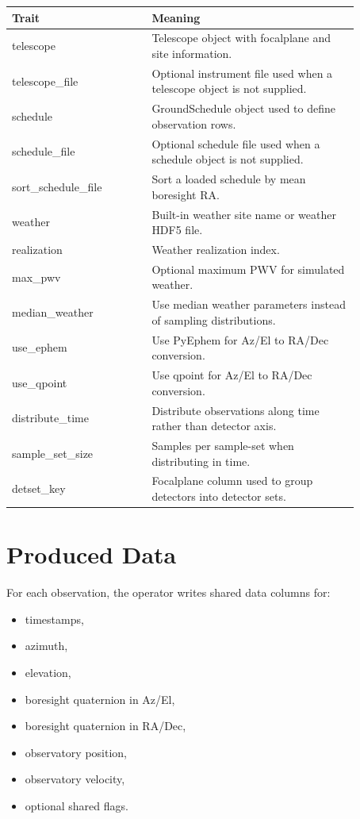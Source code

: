 \documentclass[11pt]{article}
\begin{document}
\begin{center}
\begin{tabular}{>{\ttfamily}p{0.35\linewidth}
                >{\raggedright\arraybackslash}p{0.52\linewidth}}
\toprule
Trait & Meaning \\
\midrule
telescope & Telescope object with focalplane and site information. \\
telescope\_file & Optional instrument file used when a telescope object is not supplied. \\
schedule & GroundSchedule object used to define observation rows. \\
schedule\_file & Optional schedule file used when a schedule object is not supplied. \\
sort\_schedule\_file & Sort a loaded schedule by mean boresight RA. \\
weather & Built-in weather site name or weather HDF5 file. \\
realization & Weather realization index. \\
max\_pwv & Optional maximum PWV for simulated weather. \\
median\_weather & Use median weather parameters instead of sampling distributions. \\
use\_ephem & Use PyEphem for Az/El to RA/Dec conversion. \\
use\_qpoint & Use qpoint for Az/El to RA/Dec conversion. \\
distribute\_time & Distribute observations along time rather than detector axis. \\
sample\_set\_size & Samples per sample-set when distributing in time. \\
detset\_key & Focalplane column used to group detectors into detector sets. \\
\bottomrule
\end{tabular}
\end{center}

\section*{Produced Data}

For each observation, the operator writes shared data columns for:

\begin{itemize}[leftmargin=*]
    \item timestamps,
    \item azimuth,
    \item elevation,
    \item boresight quaternion in Az/El,
    \item boresight quaternion in RA/Dec,
    \item observatory position,
    \item observatory velocity,
    \item optional shared flags.
\end{itemize}
\end{document}
